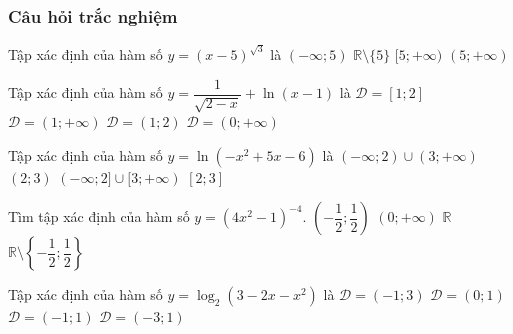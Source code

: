 \subsubsection{Câu hỏi trắc nghiệm}
\begin{ex}%
	Tập xác định của hàm số $y=(x-5)^{\sqrt{3}}$ là
	\choice
	{$(-\infty;5)$}
	{$\mathbb{R}\setminus\{5\}$}
	{$[5;+\infty)$}
	{\True $(5;+\infty)$}
\end{ex}
\begin{ex}%
	Tập xác định của hàm số $y=\dfrac{1}{\sqrt{2-x}}+\ln (x-1)$ là 
	\choice
	{$\mathscr{D}=[1; 2]$}
	{$\mathscr{D}=(1;+\infty)$}
	{\True $\mathscr{D}=(1; 2)$}
	{$\mathscr{D}=(0;+\infty)$}
\end{ex}
\begin{ex}%
	Tập xác định của hàm số  $y=\ln \left(-x^2+5x-6\right)$ là
	\choice
	{$(-\infty; 2)\cup(3;+\infty)$}
	{\True $(2; 3)$}
	{$(-\infty; 2]\cup[3;+\infty)$}
	{$[2; 3]$}
\end{ex}
\begin{ex}%
	Tìm tập xác định của hàm số $y=\left(4x^2-1\right)^{-4}$. 
	\choice
	{$\left(-\dfrac{1}{2};\dfrac{1}{2}\right)$}
	{$(0;+\infty)$}
	{$\mathbb{R}$}
	{\True $\mathbb{R}\setminus\left\{-\dfrac{1}{2};\dfrac{1}{2}\right\}$}
\end{ex}
\begin{ex}%
	Tập xác định của hàm số $y=\log_2\left(3-2x-x^2\right)$ là 
	\choice
	{$\mathscr{D}=(-1;3)$}
	{$\mathscr{D}=(0;1)$}
	{$\mathscr{D}=(-1;1)$}
	{\True $\mathscr{D}=(-3;1)$}
\end{ex}
